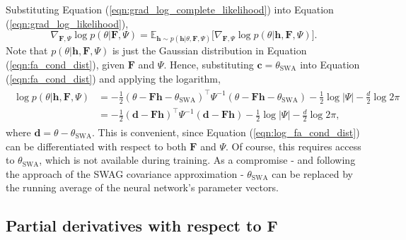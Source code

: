 \documentclass[msc,deptreport.inf]{infthesis} %
\newcommand{\matr}[1]{\mathbf{#1}}
\newcommand{\E}{\mathbb E}
\begin{document}
Substituting Equation (\ref{eqn:grad_log_complete_likelihood}) into Equation (\ref{eqn:grad_log_likelihood}),
\begin{equation}\label{eqn:simplified_grad_log_likelihood}
	\nabla_{\matr{F}, \Psi} \log p(\theta | \matr{F}, \Psi)
	= \E_{\matr{h} \sim p(\matr{h} | \theta, \matr{F}, \Psi)} \big[ \nabla_{\matr{F}, \Psi} \log p(\theta | \matr{h}, \matr{F}, \Psi) \big].
\end{equation}
Note that $p(\theta | \matr{h}, \matr{F}, \Psi)$ is just the Gaussian distribution in Equation (\ref{eqn:fa_cond_dist}), given $\matr{F}$ and $\Psi$. Hence, substituting $\matr{c} = \theta_{\text{SWA}}$ into Equation (\ref{eqn:fa_cond_dist}) and applying the logarithm,
\begin{align}\label{eqn:log_fa_cond_dist}
\begin{split}
	\log p(\theta | \matr{h}, \matr{F}, \Psi)
	& = -\frac{1}{2} (\theta - \matr{Fh} - \theta_{\text{SWA}})^\intercal \Psi^{-1} (\theta - \matr{Fh} - \theta_{\text{SWA}}) - \frac{1}{2} \log |\Psi| - \frac{d}{2} \log 2\pi \\
	& = -\frac{1}{2} (\matr{d} - \matr{Fh})^\intercal \Psi^{-1} (\matr{d}- \matr{Fh}) - \frac{1}{2} \log |\Psi| - \frac{d}{2} \log 2\pi,
\end{split}
\end{align}
where $\matr{d} = \theta - \theta_{\text{SWA}}$. This is convenient, since Equation (\ref{eqn:log_fa_cond_dist}) can be differentiated with respect to both $\matr{F}$ and $\Psi$. Of course, this requires access to $\theta_{\text{SWA}}$, which is not available during training. As a compromise - and following the approach of the SWAG covariance approximation - $\theta_{\text{SWA}}$ can be replaced by the running average of the neural network's parameter vectors.

\subsection{Partial derivatives with respect to $\matr{F}$}
\end{document}

